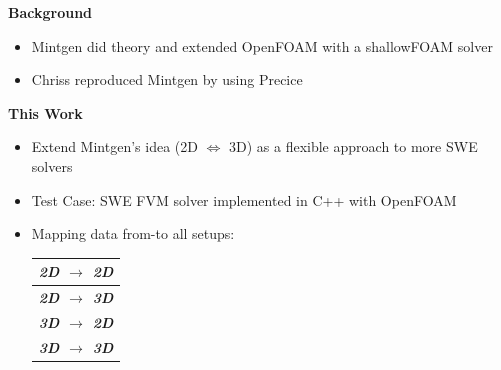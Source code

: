 
\begin{frame}
\begin{multicols}{2}
    
 \hspace{0.35\columnwidth}\textbf{Background}

 \begin{itemize}
 \item Mintgen did theory and extended OpenFOAM with a shallowFOAM solver
 \item Chriss reproduced Mintgen by using Precice
 \end{itemize}
    
 \vfill\columnbreak

\hspace{0.35\columnwidth}\textbf{This Work}
 \begin{itemize}
 \item Extend Mintgen's idea (2D $\Longleftrightarrow$ 3D) as a flexible approach to more SWE solvers
 \item Test Case: SWE FVM solver implemented in C++ with OpenFOAM 
 \item Mapping data from-to all setups:
\begin{table}[]
\begin{tabular}{|l|}
\hline
\textit{\textbf{2D $\rightarrow$ 2D}} \\ \hline
\textit{\textbf{2D $\rightarrow$ 3D}} \\ \hline
\textit{\textbf{3D $\rightarrow$ 2D}} \\ \hline
\textit{\textbf{3D $\rightarrow$ 3D}} \\ \hline
\end{tabular}
\end{table}
\end{itemize}
\end{multicols}
\end{frame}




